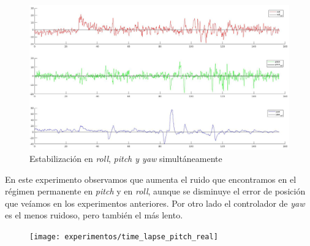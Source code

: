 \begin{figure}[htb!]
	\centering
	\includegraphics[width=0.9\textheight,angle=90]{experimentos/3_in_one_matlab}
	\vspace{0.5cm}
	\caption{Estabilización en \textit{roll}, \textit{pitch y \textit{yaw}} simultáneamente}
	\label{tl_pr}	
\end{figure}
\newpage
En este experimento observamos que aumenta el ruido que encontramos en el régimen permanente en \textit{pitch} y en \textit{roll}, aunque se disminuye el error de posición que veíamos en los experimentos anteriores. Por otro lado el controlador de \textit{yaw} es el menos ruidoso, pero también el más lento.
\begin{figure}[htb!]
	\centering
	\texttt{[image: experimentos/time\_lapse\_pitch\_real]}
	\caption{}
	\label{mat_lab_graph}	
\end{figure}



%
